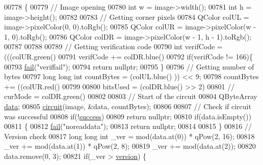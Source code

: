 \begin{DoxyCode}
00778 \{
00779     \textcolor{comment}{// Image opening}
00780     \textcolor{keywordtype}{int} w = image->width();
00781     \textcolor{keywordtype}{int} h = image->height();
00782 
00783     \textcolor{comment}{// Getting corner pixels}
00784     QColor colUL = image->pixelColor(0, 0).toRgb();
00785     QColor colUR = image->pixelColor(w - 1, 0).toRgb();
00786     QColor colDR = image->pixelColor(w - 1, h - 1).toRgb();
00787 
00788 
00789     \textcolor{comment}{// Getting verification code}
00790     \textcolor{keywordtype}{int} verifCode = (((colUR.green() %
00791     verifCode += colDR.blue() %
00792     \textcolor{keywordflow}{if}(verifCode != 166)\{
00793         \hyperlink{class_model_p_c_a47464b59b7e37fcee25e55475708aabd}{fail}(\textcolor{stringliteral}{"veriffail"});
00794         \textcolor{keywordflow}{return} \textcolor{keyword}{nullptr};
00795     \}
00796     \textcolor{comment}{// Getting number of bytes}
00797     \textcolor{keywordtype}{long} \textcolor{keywordtype}{long} \textcolor{keywordtype}{int} countBytes = (colUL.blue() %
      )) << 9;
00798     countBytes += ((colUR.red() %
00799 
00800     bitsUsed = (colDR.blue() >> 2) %
00801     \textcolor{comment}{// curMode = colDR.green() %
00802 
00803     \textcolor{comment}{// Start of the circuit}
00804     QByteArray \hyperlink{namespace_errors_dict_setup_af570460846fb9f0c91abd308a095dcdc}{data};
00805     \hyperlink{class_model_p_c_a1d0091062a0c836b283ec2f67411623b}{circuit}(image, &data, countBytes);
00806 
00807     \textcolor{comment}{// Check if circuit was successful}
00808     \textcolor{keywordflow}{if}(!\hyperlink{class_model_p_c_a945ffbbc44a832b953c191debd448f4c}{success})
00809         \textcolor{keywordflow}{return} \textcolor{keyword}{nullptr};
00810     \textcolor{keywordflow}{if}(data.isEmpty())
00811     \{
00812         \hyperlink{class_model_p_c_a47464b59b7e37fcee25e55475708aabd}{fail}(\textcolor{stringliteral}{"noreaddata"});
00813         \textcolor{keywordflow}{return} \textcolor{keyword}{nullptr};
00814 
00815     \}
00816     \textcolor{comment}{// Version check}
00817     \textcolor{keywordtype}{long} \textcolor{keywordtype}{long} \textcolor{keywordtype}{int} \_ver = mod(data.at(0)) * qPow(2, 16);
00818     \_ver += mod(data.at(1)) * qPow(2, 8);
00819     \_ver += mod(data.at(2));
00820     data.remove(0, 3);
00821     \textcolor{keywordflow}{if}(\_ver > \hyperlink{class_model_p_c_a5af48ab89e19be42a94c34ba00249401}{version}) \{
}
\end{DoxyCode}
